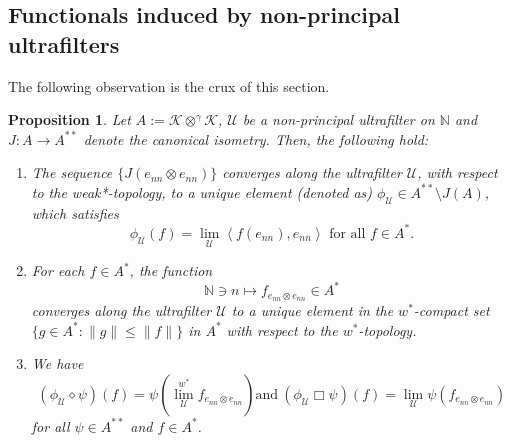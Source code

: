 \documentclass[a4]{amsart}
\theoremstyle{cupthm}
\newtheorem{prop}[thm]{Proposition}
\theoremstyle{cupdefn}
\theoremstyle{cuprem}
\numberwithin{equation}{section}
\newcommand{\ot}{\otimes}
\newcommand{\obp}{\otimes^{\gamma}}
\newcommand{\N}{\mathbb N}
\newcommand{\mK}{\mathcal{K}}
\newcommand{\mU}{\mathcal{U}}
\begin{document}
\subsection{Functionals induced by non-principal ultrafilters} The following observation is the crux of this section.
\begin{prop}\label{phi-U}
  Let $A:= \mK \obp \mK$, $\mathcal U$ be a non-principal
  ultrafilter on $\mathbb N$ and $J:A \to A^{**}$ denote the canonical isometry. Then, the following hold:
\begin{enumerate}
\item The sequence $\{J(e_{nn} \ot e_{nn})\}$ converges along
  the ultrafilter $\mathcal{U}$, with respect to the weak*-topology, to a unique element
  (denoted as) $\phi_{\mathcal{U}} \in A^{**} \setminus J(A)$, which satisfies
\[
\phi_{\mathcal
  U}(f)=\lim_{\mathcal U}\left<f(e_{nn}),e_{nn}\right> \text{ for all $f \in A^{*}$}.
\]


\item For each $f \in A^*$, the function
\[
\N
\ni n \mapsto f_{ e_{nn}\otimes e_{nn}} \in A^*
\]
converges along the ultrafilter $\mU$ to a unique element in the
$w^*$-compact set $\{g \in A^*: \|g\| \leq \|f\|\}$ in $A^*$ with
respect to the $w^*$-topology.
\item We have
\begin{equation} \label{eqn:3.1}
(\phi_{\mathcal U}\diamond
  \psi)(f)=\psi\left(\overset{w^*}{\lim_{\mathcal U}} f_{ e_{nn}\otimes
    e_{nn}}\right) \mathrm{ and }\ (\phi_{\mathcal U}\Box \psi)(f) =
  \lim_{\mathcal U}\psi(f_{ e_{nn} \otimes e_{nn}})
\end{equation}
for all $\psi \in A^{**}$  and  $f\in A^*$.
\end{enumerate}
\end{prop}
\end{document}
